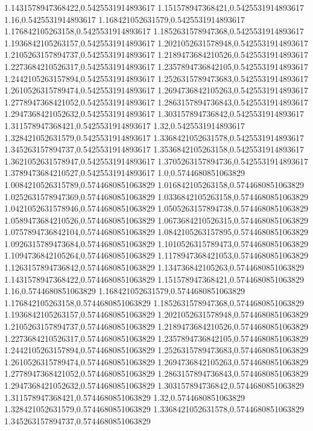 1.1431578947368422,0.5425531914893617
1.151578947368421,0.5425531914893617
1.16,0.5425531914893617
1.168421052631579,0.5425531914893617
1.176842105263158,0.5425531914893617
1.1852631578947368,0.5425531914893617
1.1936842105263157,0.5425531914893617
1.2021052631578948,0.5425531914893617
1.2105263157894737,0.5425531914893617
1.2189473684210526,0.5425531914893617
1.2273684210526317,0.5425531914893617
1.2357894736842105,0.5425531914893617
1.2442105263157894,0.5425531914893617
1.2526315789473683,0.5425531914893617
1.2610526315789474,0.5425531914893617
1.2694736842105263,0.5425531914893617
1.2778947368421052,0.5425531914893617
1.2863157894736843,0.5425531914893617
1.2947368421052632,0.5425531914893617
1.303157894736842,0.5425531914893617
1.311578947368421,0.5425531914893617
1.32,0.5425531914893617
1.328421052631579,0.5425531914893617
1.3368421052631578,0.5425531914893617
1.345263157894737,0.5425531914893617
1.3536842105263158,0.5425531914893617
1.3621052631578947,0.5425531914893617
1.3705263157894736,0.5425531914893617
1.3789473684210527,0.5425531914893617
1.0,0.5744680851063829
1.0084210526315789,0.5744680851063829
1.016842105263158,0.5744680851063829
1.0252631578947369,0.5744680851063829
1.0336842105263158,0.5744680851063829
1.0421052631578946,0.5744680851063829
1.0505263157894738,0.5744680851063829
1.0589473684210526,0.5744680851063829
1.0673684210526315,0.5744680851063829
1.0757894736842104,0.5744680851063829
1.0842105263157895,0.5744680851063829
1.0926315789473684,0.5744680851063829
1.1010526315789473,0.5744680851063829
1.1094736842105264,0.5744680851063829
1.1178947368421053,0.5744680851063829
1.1263157894736842,0.5744680851063829
1.134736842105263,0.5744680851063829
1.1431578947368422,0.5744680851063829
1.151578947368421,0.5744680851063829
1.16,0.5744680851063829
1.168421052631579,0.5744680851063829
1.176842105263158,0.5744680851063829
1.1852631578947368,0.5744680851063829
1.1936842105263157,0.5744680851063829
1.2021052631578948,0.5744680851063829
1.2105263157894737,0.5744680851063829
1.2189473684210526,0.5744680851063829
1.2273684210526317,0.5744680851063829
1.2357894736842105,0.5744680851063829
1.2442105263157894,0.5744680851063829
1.2526315789473683,0.5744680851063829
1.2610526315789474,0.5744680851063829
1.2694736842105263,0.5744680851063829
1.2778947368421052,0.5744680851063829
1.2863157894736843,0.5744680851063829
1.2947368421052632,0.5744680851063829
1.303157894736842,0.5744680851063829
1.311578947368421,0.5744680851063829
1.32,0.5744680851063829
1.328421052631579,0.5744680851063829
1.3368421052631578,0.5744680851063829
1.345263157894737,0.5744680851063829
